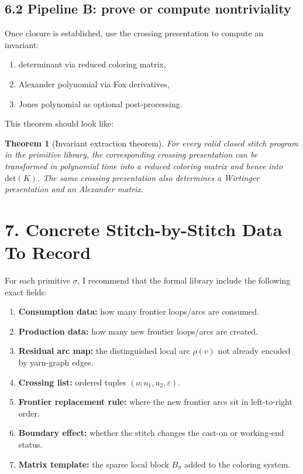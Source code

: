 \documentclass[11pt]{article}
\newtheorem{theorem}{Theorem}
\newcommand{\detK}{\mathrm{det}}
\begin{document}
\subsection*{6.2 Pipeline B: prove or compute nontriviality}
Once closure is established, use the crossing presentation to compute an invariant:
\begin{enumerate}[leftmargin=1.5em,itemsep=0.2em]
    \item determinant via reduced coloring matrix,
    \item Alexander polynomial via Fox derivatives,
    \item Jones polynomial as optional post-processing.
\end{enumerate}

This theorem should look like:

\begin{theorem}[Invariant extraction theorem]
For every valid closed stitch program in the primitive library, the corresponding crossing presentation can be transformed in polynomial time into a reduced coloring matrix and hence into \(\detK(K)\). The same crossing presentation also determines a Wirtinger presentation and an Alexander matrix.
\end{theorem}

\section*{7. Concrete Stitch-by-Stitch Data To Record}
For each primitive \(\sigma\), I recommend that the formal library include the following exact fields:

\begin{enumerate}[leftmargin=1.5em,itemsep=0.2em]
    \item \textbf{Consumption data:} how many frontier loops/arcs are consumed.
    \item \textbf{Production data:} how many new frontier loops/arcs are created.
    \item \textbf{Residual arc map:} the distinguished local arc \(\rho(v)\) not already encoded by yarn-graph edges.
    \item \textbf{Crossing list:} ordered tuples \((o;u_1,u_2,\varepsilon)\).
    \item \textbf{Frontier replacement rule:} where the new frontier arcs sit in left-to-right order.
    \item \textbf{Boundary effect:} whether the stitch changes the cast-on or working-end status.
    \item \textbf{Matrix template:} the sparse local block \(B_\sigma\) added to the coloring system.
\end{enumerate}
\end{document}
